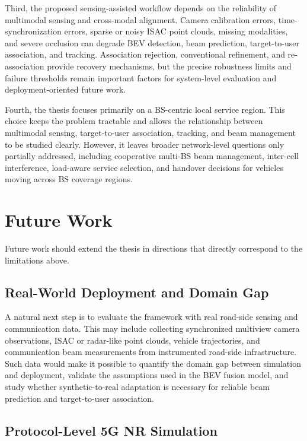 Third, the proposed sensing-assisted workflow depends on the reliability of
multimodal sensing and cross-modal alignment. Camera calibration errors,
time-synchronization errors, sparse or noisy ISAC point clouds, missing
modalities, and severe occlusion can degrade BEV detection, beam prediction,
target-to-user association, and tracking. Association rejection, conventional
refinement, and re-association provide recovery mechanisms, but the precise
robustness limits and failure thresholds remain important factors for
system-level evaluation and deployment-oriented future work.

Fourth, the thesis focuses primarily on a BS-centric local service region.
This choice keeps the problem tractable and allows the relationship between
multimodal sensing, target-to-user association, tracking, and beam management to
be studied clearly. However, it leaves broader network-level questions only
partially addressed, including cooperative multi-BS beam management,
inter-cell interference, load-aware service selection, and handover decisions
for vehicles moving across BS coverage regions.

\section{Future Work}
\label{sec:conclusion-future-work}

Future work should extend the thesis in directions that directly correspond to
the limitations above.

\subsection{Real-World Deployment and Domain Gap}
\label{subsec:future-domain-gap}

A natural next step is to evaluate the framework with real road-side sensing
and communication data. This may include collecting synchronized multiview
camera observations, ISAC or radar-like point clouds, vehicle trajectories, and
communication beam measurements from instrumented road-side infrastructure.
Such data would make it possible to quantify the domain gap between simulation
and deployment, validate the assumptions used in the BEV fusion model, and
study whether synthetic-to-real adaptation is necessary for reliable beam
prediction and target-to-user association.

\subsection{Protocol-Level 5G NR Simulation}
\label{subsec:future-5g-nr}

